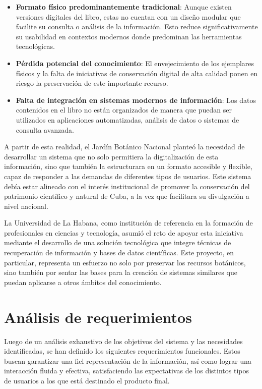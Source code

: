\begin{itemize}
    \item \textbf{Formato físico predominantemente tradicional}: Aunque existen versiones 
    digitales del libro, estas no cuentan con un diseño modular que facilite su consulta 
    o análisis de la información. Esto reduce significativamente su usabilidad en contextos 
    modernos donde predominan las herramientas tecnológicas.
    \item \textbf{Pérdida potencial del conocimiento}: El envejecimiento de los ejemplares físicos 
    y la falta de iniciativas de conservación digital de alta calidad ponen en riesgo 
    la preservación de este importante recurso.
    \item \textbf{Falta de integración en sistemas modernos de información}: Los datos 
    contenidos en el libro no están organizados de manera que puedan ser utilizados 
    en aplicaciones automatizadas, análisis de datos o sistemas de consulta avanzada.
\end{itemize}

A partir de esta realidad, el Jardín Botánico Nacional planteó la necesidad de desarrollar 
un sistema que no solo permitiera la digitalización de esta información, 
sino que también la estructurara en un formato accesible y flexible, 
capaz de responder a las demandas de diferentes tipos de usuarios. 
Este sistema debía estar alineado con el interés institucional de promover la conservación 
del patrimonio científico y natural de Cuba, a la vez que facilitara su divulgación 
a nivel nacional.

La Universidad de La Habana, como institución de referencia en la formación de 
profesionales en ciencias y tecnología, asumió el reto de apoyar esta iniciativa 
mediante el desarrollo de una solución tecnológica que integre técnicas de recuperación 
de información y bases de datos científicas. Este proyecto, en particular, 
representa un esfuerzo no solo por preservar los recursos botánicos, 
sino también por sentar las bases para la creación de sistemas similares que puedan 
aplicarse a otros ámbitos del conocimiento.





\section{Análisis de requerimientos}
Luego de un análisis exhaustivo de los objetivos del sistema y las necesidades 
identificadas, se han definido los siguientes requerimientos funcionales. 
Estos buscan garantizar una fiel representación de la información, así como 
lograr una interacción fluida y efectiva, 
satisfaciendo las expectativas de los distintos tipos de usuarios a los
que está destinado el producto final.

